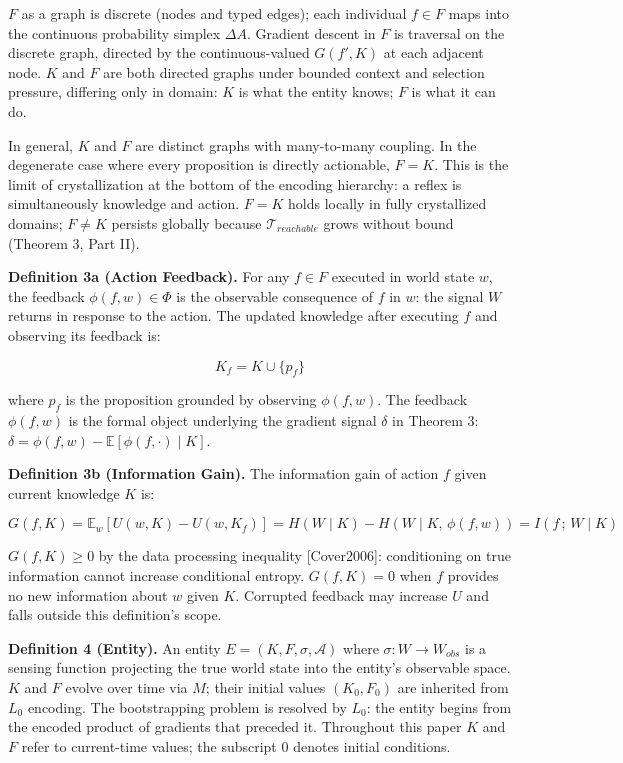 \documentclass[
]{article}
\begin{document}
\(F\) as a graph is discrete (nodes and typed edges); each individual
\(f \in F\) maps into the continuous probability simplex \(\Delta A\).
Gradient descent in \(F\) is traversal on the discrete graph, directed
by the continuous-valued \(G(f', K)\) at each adjacent node. \(K\) and
\(F\) are both directed graphs under bounded context and selection
pressure, differing only in domain: \(K\) is what the entity knows;
\(F\) is what it can do.

In general, \(K\) and \(F\) are distinct graphs with many-to-many
coupling. In the degenerate case where every proposition is directly
actionable, \(F = K\). This is the limit of crystallization at the
bottom of the encoding hierarchy: a reflex is simultaneously knowledge
and action. \(F = K\) holds locally in fully crystallized domains;
\(F \neq K\) persists globally because \(\mathcal{T}_{reachable}\) grows
without bound (Theorem 3, Part II).

\textbf{Definition 3a (Action Feedback).} For any \(f \in F\) executed
in world state \(w\), the feedback \(\phi(f, w) \in \Phi\) is the
observable consequence of \(f\) in \(w\): the signal \(W\) returns in
response to the action. The updated knowledge after executing \(f\) and
observing its feedback is:

\[K_f = K \cup \{p_f\}\]

where \(p_f\) is the proposition grounded by observing \(\phi(f, w)\).
The feedback \(\phi(f,w)\) is the formal object underlying the gradient
signal \(\delta\) in Theorem 3: \(\delta =
\phi(f, w) - \mathbb{E}[\phi(f, \cdot) \mid K]\).

\textbf{Definition 3b (Information Gain).} The information gain of
action \(f\) given current knowledge \(K\) is:

\[G(f, K) = \mathbb{E}_w\!\left[U(w, K) - U(w, K_f)\right] = H(W \mid K) - H(W \mid K,\, \phi(f, w)) = I(f\,;\, W \mid K)\]

\(G(f, K) \geq 0\) by the data processing inequality
{[}Cover2006{]}: conditioning on true information cannot increase
conditional entropy. \(G(f, K) = 0\) when \(f\) provides no new
information about \(w\) given \(K\). Corrupted feedback may increase
\(U\) and falls outside this definition's scope.

\textbf{Definition 4 (Entity).} An entity
\(E = (K, F, \sigma, \mathcal{A})\) where
\(\sigma : W \rightarrow W_{obs}\) is a sensing function projecting the
true world state into the entity's observable space. \(K\) and \(F\)
evolve over time via \(M\); their initial values \((K_0, F_0)\) are
inherited from \(L_0\) encoding. The bootstrapping problem is resolved
by \(L_0\): the entity begins from the encoded product of gradients that
preceded it. Throughout this paper \(K\) and \(F\) refer to
current-time values; the subscript \(0\) denotes initial conditions.
\end{document}

